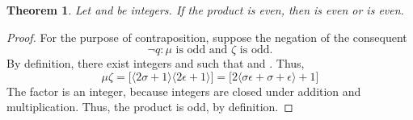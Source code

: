\documentclass[preview]{standalone}
\newtheorem{theorem}{Theorem}
\begin{document}
\begin{theorem} %
    Let \bm{$\mu$} and \bm{$\zeta$} be integers. 
    If the product \bm{$\mu\zeta$} is even, 
    then \bm{$\mu$} is even or \bm{$\zeta$} is even.
\end{theorem}

\begin{proof}
    For the purpose of contraposition, suppose the negation of the consequent 
        $$\lnot q : \mu \text{ is odd and } \zeta \text{ is odd.}$$ 
    By definition, 
    there exist integers \bm{$\sigma$} and \bm{$\epsilon$} such that 
     and . 
    Thus, 
    \begin{equation*}
        \mu\zeta 
            =
        \Big[ 
            \big \langle 2 \sigma + 1 \big \rangle
            \big \langle 2 \epsilon + 1 \big \rangle 
        \Big]
            =
        \Big[ 
            2 
            \big \langle \sigma\epsilon + \sigma + \epsilon \big \rangle 
                + 
            1
        \Big]
    \end{equation*}
    The factor 
    \bm{$\big \langle \sigma \epsilon + \sigma + \epsilon \big \rangle$} 
    is an integer, 
    because integers are closed under addition and multiplication. 
    Thus, the product \bm{$\mu \zeta$} is odd, by definition.
\color{lightgray} \end{proof}
\
\end{document}
